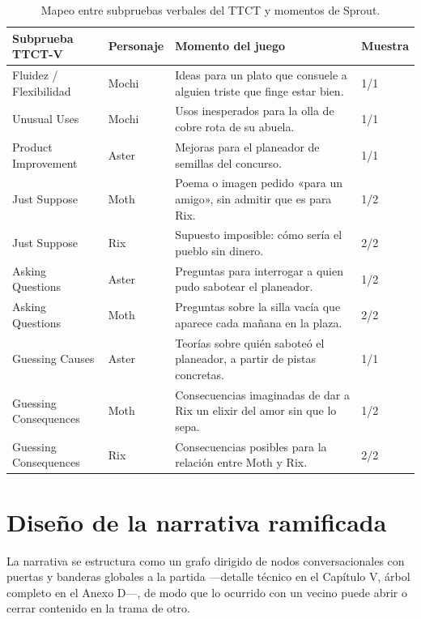 \documentclass[12pt,twoside,titlepage]{report}
\begin{document}
\begin{table}[h]
  \centering
  \caption{Mapeo entre subpruebas verbales del TTCT y momentos de Sprout.}
  \label{tab:mapeo_ttct}
  \begin{footnotesize}
  \renewcommand{\arraystretch}{1.3}
  \begin{tabular}{p{3.6cm}p{2.2cm}p{5.4cm}p{1.8cm}}
    \hline
    \textbf{Subprueba TTCT-V} & \textbf{Personaje} & \textbf{Momento del juego} & \textbf{Muestra} \\
    \hline
    Fluidez / Flexibilidad & Mochi & Ideas para un plato que consuele a alguien triste que finge estar bien. & 1/1 \\
    \hline
    Unusual Uses & Mochi & Usos inesperados para la olla de cobre rota de su abuela. & 1/1 \\
    \hline
    Product Improvement & Aster & Mejoras para el planeador de semillas del concurso. & 1/1 \\
    \hline
    Just Suppose & Moth & Poema o imagen pedido «para un amigo», sin admitir que es para Rix. & 1/2 \\
    \hline
    Just Suppose & Rix & Supuesto imposible: cómo sería el pueblo sin dinero. & 2/2 \\
    \hline
    Asking Questions & Aster & Preguntas para interrogar a quien pudo sabotear el planeador. & 1/2 \\
    \hline
    Asking Questions & Moth & Preguntas sobre la silla vacía que aparece cada mañana en la plaza. & 2/2 \\
    \hline
    Guessing Causes & Aster & Teorías sobre quién saboteó el planeador, a partir de pistas concretas. & 1/1 \\
    \hline
    Guessing Consequences & Moth & Consecuencias imaginadas de dar a Rix un elixir del amor sin que lo sepa. & 1/2 \\
    \hline
    Guessing Consequences & Rix & Consecuencias posibles para la relación entre Moth y Rix. & 2/2 \\
    \hline
  \end{tabular}
  \end{footnotesize}
\end{table}

\section{Diseño de la narrativa ramificada}
La narrativa se estructura como un grafo dirigido de nodos conversacionales con puertas y banderas globales a la partida ---detalle técnico en el Capítulo V, árbol completo en el Anexo D---, de modo que lo ocurrido con un vecino puede abrir o cerrar contenido en la trama de otro.
\end{document}
